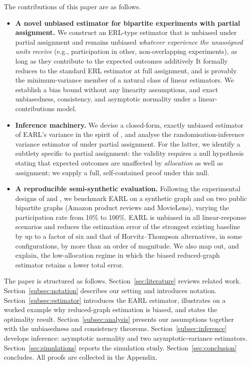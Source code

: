 \documentclass[sigconf,nonacm]{acmart}
\newcounter{assumption}
\begin{document}
The contributions of this paper are as follows.
\begin{itemize}
    \item \textbf{A novel unbiased estimator for bipartite experiments with partial assignment.} We construct an ERL-type estimator that is unbiased under partial assignment and remains unbiased \emph{whatever experience the unassigned units receive} (e.g., participation in other, non-overlapping experiments), as long as they contribute to the expected outcomes additively It formally reduces to the standard ERL estimator at full assignment, and is provably the minimum-variance member of a natural class of linear estimators. We establish a bias bound without any linearity assumptions, and exact unbiasedness, consistency, and asymptotic normality under a linear-contributions model.
    \item \textbf{Inference machinery.} We devise a closed-form, exactly unbiased estimator of EARL's variance in the spirit of \citet{harshaw2023erl}, and analyse the randomisation-inference variance estimator of \citet{shi2025scalableanalysisbipartiteexperiments} under partial assignment. For the latter, we identify a subtlety specific to partial assignment: the validity requires a null hypothesis stating that expected outcomes are unaffected by \emph{allocation} as well as assignment; we supply a full, self-contained proof under this null.
    \item \textbf{A reproducible semi-synthetic evaluation.} Following the experimental designs of \citet{doudchenko2020causal} and \citet{harshaw2023erl}, we benchmark EARL on a synthetic graph and on two public bipartite graphs (Amazon product reviews and MovieLens), varying the participation rate from 10\% to 100\%. EARL is unbiased in all linear-response scenarios and reduces the estimation error of the strongest existing baseline by up to a factor of six and that of Horvitz--Thompson alternatives, in some configurations, by more than an order of magnitude. We also map out, and explain, the low-allocation regime in which the biased reduced-graph estimator retains a lower total error.
\end{itemize}

The paper is structured as follows. Section~\ref{sec:literature} reviews related work. Section~\ref{subsec:notation} describes our setting and introduces notation. Section~\ref{subsec:estimator} introduces the EARL estimator, illustrates on a worked example why reduced-graph estimation is biased, and states the optimality result. Section~\ref{subsec:analysis} presents our assumptions together with the unbiasedness and consistency theorems. Section~\ref{subsec:inference} develops inference: asymptotic normality and two asymptotic-variance estimators. Section~\ref{sec:simulations} reports the simulation study. Section~\ref{sec:conclusion} concludes. All proofs are collected in the Appendix.
\end{document}
